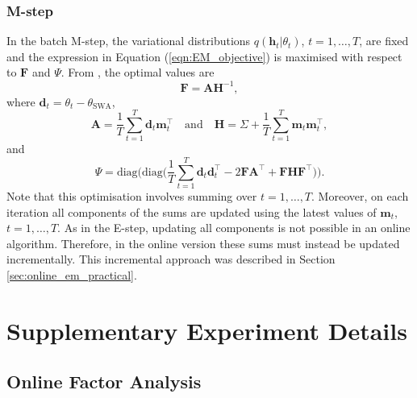 \documentclass[msc,deptreport.inf]{infthesis} %
\newcommand{\matr}[1]{\mathbf{#1}}
\begin{document}
\subsection{M-step}

In the batch M-step, the variational distributions $q(\matr{h}_t | \theta_t)$, $t=1,\dots,T$, are fixed and the expression in Equation (\ref{eqn:EM_objective}) is maximised with respect to $\matr{F}$ and $\Psi$. From \cite{barber2007}, the optimal values are 
\begin{equation}
	\matr{F} = \matr{A}\matr{H}^{-1}, 
\end{equation}
where $\matr{d}_t = \theta_t - \theta_{\text{SWA}}$,
\begin{equation}
	\matr{A} = \frac{1}{T} \sum_{t=1}^T \matr{d}_t \matr{m}_t^\intercal \quad \text{and} \quad 
	\matr{H} = \Sigma + \frac{1}{T} \sum_{t=1}^T \matr{m}_t \matr{m}_t^\intercal,
\end{equation}
and
\begin{equation}
	\Psi = \text{diag}\Bigg(\text{diag}\Bigg( \frac{1}{T} \sum_{t=1}^T \matr{d}_t \matr{d}_t^\intercal - 2\matr{FA}^\intercal + \matr{FHF}^\intercal \Bigg)\Bigg).
\end{equation}
Note that this optimisation involves summing over $t=1,\dots,T$. Moreover, on each iteration all components of the sums are updated using the latest values of $\matr{m}_t$, $t=1,\dots,T$. As in the E-step, updating all components is not possible in an online algorithm. Therefore, in the online version these sums must instead be updated incrementally. This incremental approach was described in Section \ref{sec:online_em_practical}.


 \chapter{Supplementary Experiment Details}
 
 \section{Online Factor Analysis}\label{app:online_fa}
 
\end{document}
